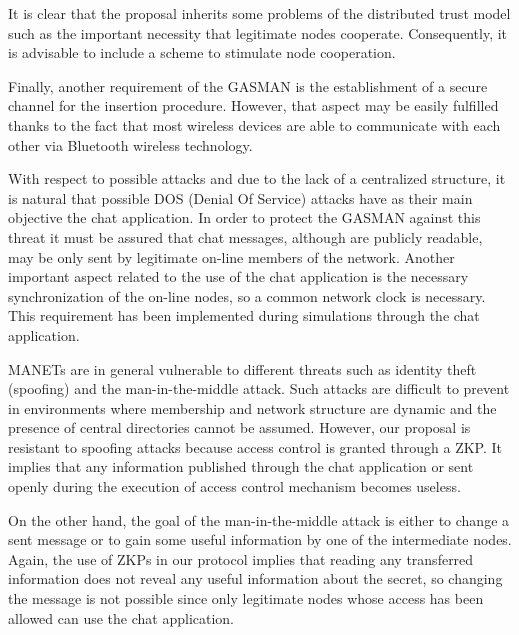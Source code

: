 \documentclass[conference]{IEEEtran}
\begin{document}
It is clear that the proposal inherits some problems of the distributed trust model such as the important necessity that legitimate nodes cooperate. Consequently, it is advisable to include a scheme to stimulate node cooperation.

Finally, another requirement of the GASMAN is the establishment of a secure channel for the insertion procedure. However, that aspect may be easily fulfilled thanks to the fact
that most wireless devices are able to communicate with each other via Bluetooth wireless technology.

With respect to possible attacks and due to the lack of a centralized
structure, it is natural that possible DOS (Denial Of Service)
attacks have as their main objective the chat application. In
order to protect the GASMAN against this threat it must be assured
that chat messages, although are publicly readable, may be only
sent by legitimate on-line members of the network. Another
important aspect related to the use of the chat application is the
necessary synchronization of the on-line nodes, so a common
network clock is necessary.  This requirement has been implemented
during simulations through the chat application.

MANETs are in general vulnerable to different threats such as
identity theft (spoofing) and the man-in-the-middle attack. Such
attacks are difficult to prevent in environments where membership
and network structure are dynamic and the presence of central
directories cannot be assumed. However, our proposal is resistant
to spoofing attacks because access control is granted through a ZKP. It implies
that any information published through the chat application or sent openly during the execution of access control mechanism becomes useless.


On the other hand, the goal of the man-in-the-middle
attack is  either to change a sent message or to gain some useful
information by one of the intermediate nodes. Again, the use of
ZKPs in our protocol implies that reading any transferred
information does not reveal any useful information about the
secret, so changing the message is not possible since only
legitimate nodes whose access has been allowed can use the chat
application.
\end{document}
